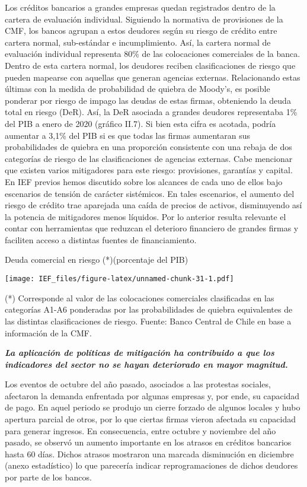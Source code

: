 \documentclass[
]{book}
\begin{document}
Los créditos bancarios a grandes empresas quedan registrados dentro de la
cartera de evaluación individual. Siguiendo la normativa de provisiones de la
CMF, los bancos agrupan a estos deudores según su riesgo de crédito entre
cartera normal, sub-estándar e incumplimiento. Así, la cartera normal de
evaluación individual representa 80\% de las colocaciones comerciales de la
banca. Dentro de esta cartera normal, los deudores reciben clasificaciones de
riesgo que pueden mapearse con aquellas que generan agencias externas.
Relacionando estas últimas con la medida de probabilidad de quiebra de
Moody's, es posible ponderar por riesgo de impago las deudas de estas
firmas, obteniendo la deuda total en riesgo (DeR). Así, la DeR asociada a
grandes deudores representaba 1\% del PIB a enero de 2020 (gráfico II.7).
Si bien esta cifra es acotada, podría aumentar a 3,1\% del PIB si es que todas
las firmas aumentaran sus probabilidades de quiebra en una proporción
consistente con una rebaja de dos categorías de riesgo de las clasificaciones
de agencias externas. Cabe mencionar que existen varios mitigadores para
este riesgo: provisiones, garantías y capital. En IEF previos hemos discutido
sobre los alcances de cada uno de ellos bajo escenarios de tensión de carácter
sistémicos. En tales escenarios, el aumento del riesgo de crédito trae aparejada
una caída de precios de activos, disminuyendo así la potencia de mitigadores
menos líquidos. Por lo anterior resulta relevante el contar con herramientas que
reduzcan el deterioro financiero de grandes firmas y faciliten acceso a distintas
fuentes de financiamiento.

Deuda comercial en riesgo (*)(porcentaje del PIB)

\texttt{[image: IEF\_files/figure-latex/unnamed-chunk-31-1.pdf]}

(*) Corresponde al valor de las colocaciones comerciales clasificadas en las categorías A1-A6 ponderadas por las probabilidades de quiebra equivalentes de las distintas clasificaciones de riesgo.
Fuente: Banco Central de Chile en base a información de la CMF.

\textbf{\emph{La aplicación de políticas de mitigación ha contribuido a que los
indicadores del sector no se hayan deteriorado en mayor magnitud.}}

Los eventos de octubre del año pasado, asociados a las protestas sociales,
afectaron la demanda enfrentada por algunas empresas y, por ende, su
capacidad de pago. En aquel periodo se produjo un cierre forzado de
algunos locales y hubo apertura parcial de otros, por lo que ciertas firmas
vieron afectada su capacidad para generar ingresos. En consecuencia, entre
octubre y noviembre del año pasado, se observó un aumento importante en
los atrasos en créditos bancarios hasta 60 días. Dichos atrasos mostraron una
marcada disminución en diciembre (anexo estadístico) lo que parecería indicar
reprogramaciones de dichos deudores por parte de los bancos.
\end{document}
